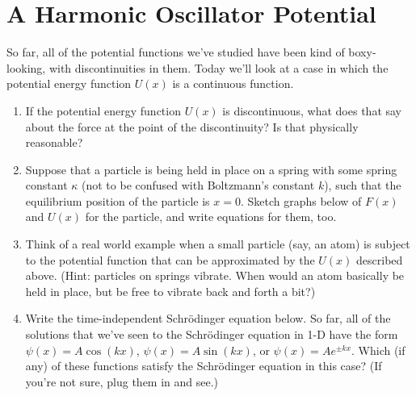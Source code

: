 \section{A Harmonic Oscillator Potential}

\makelabheader %

\bigskip

So far, all of the potential functions we've studied have been kind of boxy-looking, with discontinuities in them.  Today we'll look at a case in which the potential energy function $U(x)$ is a continuous function.  

\begin{enumerate}[wide]

\item If the potential energy function $U(x)$ is discontinuous, what does that say about the force at the point of the discontinuity?  Is that physically reasonable?
\answerspace{0.6in}

\item Suppose that a particle is being held in place on a spring with some spring constant $\kappa$  (not to be confused with Boltzmann's constant $k$), such that the equilibrium position of the particle is $x=0$.  Sketch graphs below of $F(x)$ and $U(x)$ for the particle, and write equations for them, too.
\begin{center}
\begin{lab_axis}[lab_noticks_4quads,
	width={2.5in}, height={1.5in},
	xlabel={$x$},
	ylabel={$F$},
	]
\end{lab_axis}
\hspace{0.2in}
\begin{lab_axis}[lab_noticks_4quads,
	width={2.5in}, height={1.5in},
	xlabel={$x$},
	ylabel={$U$},
	ymin=-0.3,
	]
\end{lab_axis}
\end{center}

\bigskip

\item Think of a real world example when a small particle (say, an atom) is subject to the potential function that can be approximated by the $U(x)$ described above.  (Hint: particles on springs vibrate.  When would an atom basically be held in place, but be free to vibrate back and forth a bit?)
\answerspace{0.6in}

\item Write the time-independent Schr\"odinger equation below.  So far, all of the solutions that we've seen to the 
Schr\"odinger equation in 1-D have the form $\psi(x) = A\cos(kx)$, $\psi(x) = A\sin(kx)$, or $\psi(x) = Ae^{\pm kx}$.  Which (if any) of these functions satisfy the Schr\"odinger equation in this case?  (If you're not sure, plug them in and see.) 
\answerspace{1.8in}


\end{enumerate}

